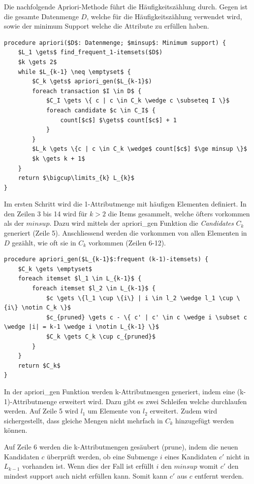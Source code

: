 Die nachfolgende Apriori-Methode führt die Häufigkeitszählung durch.
Gegen ist die gesamte Datenmenge $D$, welche für die Häufigkeitszählung verwendet wird, sowie der minimum Support welche die Attribute zu erfüllen haben.
\begin{lstlisting}
procedure apriori($D$: Datenmenge; $minsup$: Minimum support) {
	$L_1 \gets$ find_frequent_1-itemsets($D$)
	$k \gets 2$
	while $L_{k-1} \neq \emptyset$ {
		$C_k \gets$ apriori_gen($L_{k-1}$)
		foreach transaction $I \in D$ {
			$C_I \gets \{ c | c \in C_k \wedge c \subseteq I \}$
			foreach candidate $c \in C_I$ {
				count[$c$] $\gets$ count[$c$] + 1
			}
		}
		$L_k \gets \{c | c \in C_k \wedge$ count[$c$] $\ge minsup \}$
		$k \gets k + 1$
	}
	return $\bigcup\limits_{k} L_{k}$
}
\end{lstlisting}
Im ersten Schritt wird die 1-Attributmenge mit häufigen Elementen definiert. In den Zeilen 3 bis 14 wird für $k > 2$ die Items gesammelt, welche öfters vorkommen als der $minsup$. Dazu wird mittels der apriori\_gen Funktion die \textit{Candidates} $C_k$ generiert (Zeile 5).
Anschliessend werden die vorkommen von allen Elementen in $D$ gezählt, wie oft sie in $C_k$ vorkommen (Zeilen 6-12).


\begin{lstlisting}
procedure apriori_gen($L_{k-1}$:frequent (k-1)-itemsets) {
	$C_k \gets \emptyset$
	foreach itemset $l_1 \in L_{k-1}$ {
		foreach itemset $l_2 \in L_{k-1}$ {
			$c \gets \{l_1 \cup \{i\} | i \in l_2 \wedge l_1 \cup \{i\} \notin C_k \}$
			$c_{pruned} \gets c - \{ c' | c' \in c \wedge i \subset c \wedge |i| = k-1 \wedge i \notin L_{k-1} \}$
			$C_k \gets C_k \cup c_{pruned}$
		}
	}
	return $C_k$
}
\end{lstlisting}
In der apriori\_gen Funktion werden k-Attributmengen generiert, indem eine (k-1)-Attributmenge erweitert wird. Dazu gibt es zwei Schleifen welche durchlaufen werden. Auf Zeile 5 wird $l_1$ um Elemente von $l_2$ erweitert. Zudem wird sichergestellt, dass gleiche Mengen nicht mehrfach in $C_k$ hinzugefügt werden können.

Auf Zeile 6 werden die k-Attributmengen gesäubert (prune), indem die neuen Kandidaten $c$ überprüft werden, ob eine Submenge $i$ eines Kandidaten $c'$ nicht in $L_{k-1}$ vorhanden ist. Wenn dies der Fall ist erfüllt $i$ den $minsup$ womit $c'$ den mindest support auch nicht erfüllen kann. Somit kann $c'$ aus $c$ entfernt werden.

